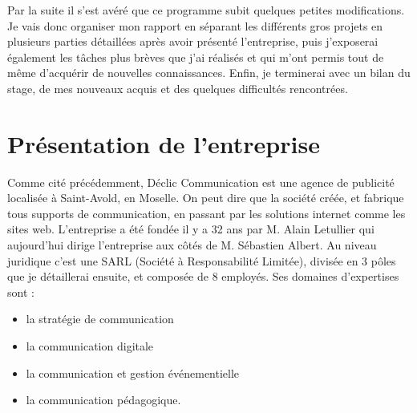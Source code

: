 \documentclass[report]{tnreport}
\begin{document}
Par la suite il s’est avéré que ce programme subit quelques petites modifications. Je vais donc organiser mon rapport en séparant les différents gros projets en plusieurs parties détaillées après avoir présenté l’entreprise, puis j’exposerai également les tâches plus brèves que j’ai réalisés et qui m’ont permis tout de même d’acquérir de nouvelles connaissances. Enfin, je terminerai avec un bilan du stage, de mes nouveaux acquis et des quelques difficultés rencontrées.



\chapter{Présentation de l'entreprise}


Comme cité précédemment, Déclic Communication est une agence de publicité localisée à Saint-Avold, en Moselle. On peut dire que la société créée, et fabrique tous supports de communication, en passant par les solutions internet comme les sites web. L’entreprise a été fondée il y a 32 ans par M. Alain Letullier qui aujourd’hui dirige l’entreprise aux côtés de M. Sébastien Albert. Au niveau juridique c’est une SARL (Société à Responsabilité Limitée), divisée en 3 pôles que je détaillerai ensuite, et composée de 8 employés.
Ses domaines d’expertises sont :
\begin{itemize}
\item la stratégie de communication
\item la communication digitale
\item la communication et gestion événementielle
\item la communication pédagogique.
\end{itemize}
\end{document}
